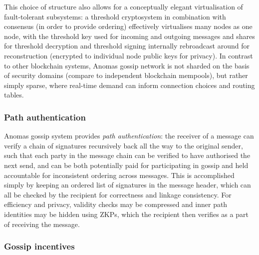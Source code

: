 This choice of structure also allows for a conceptually elegant
virtualisation of fault-tolerant subsystems: a threshold cryptosystem in
combination with consensus (in order to provide ordering) effectively
virtualises many nodes as one node, with the threshold key used for
incoming and outgoing messages and shares for threshold decryption and
threshold signing internally rebroadcast around for reconstruction
(encrypted to individual node public keys for privacy). In contrast to
other blockchain systems, Anoma\textquotesingle s gossip network is not
sharded on the basis of security domains (compare to independent
blockchain mempools), but rather simply sparse, where real-time demand
can inform connection choices and routing tables.

\subsubsection{Path authentication}\label{path-authentication}

Anoma\textquotesingle s gossip system provides \emph{path
authentication}: the receiver of a message can verify a chain of
signatures recursively back all the way to the original sender, such
that each party in the message chain can be verified to have authorised
the next send, and can be both potentially paid for participating in
gossip and held accountable for inconsistent ordering across messages.
This is accomplished simply by keeping an ordered list of signatures in
the message header, which can all be checked by the recipient for
correctness and linkage consistency. For efficiency and privacy,
validity checks may be compressed and inner path identities may be
hidden using ZKPs, which the recipient then verifies as a part of
receiving the message.

\subsubsection{Gossip incentives}\label{gossip-incentives}

